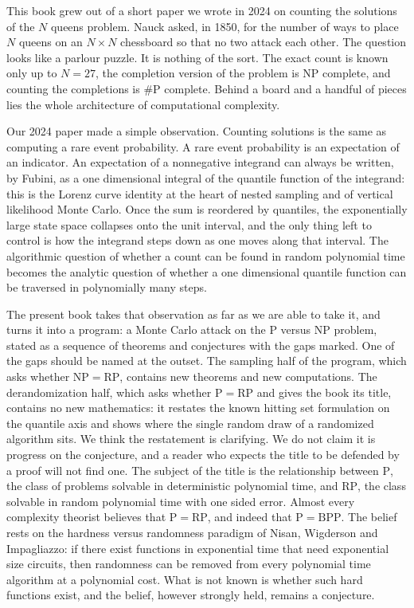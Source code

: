 \documentclass[11pt,twoside,openany]{book}
\theoremstyle{plain}
\theoremstyle{definition}
\theoremstyle{remark}
\newcommand{\RP}{\mathrm{RP}}
\newcommand{\BPP}{\mathrm{BPP}}
\newcommand{\NP}{\mathrm{NP}}
\newcommand{\Pc}{\mathrm{P}}
\newcommand{\sharpP}{\#\mathrm{P}}
\begin{document}
This book grew out of a short paper we wrote in 2024 on counting the solutions of the $N$ queens problem. Nauck asked, in 1850, for the number of ways to place $N$ queens on an $N \times N$ chessboard so that no two attack each other. The question looks like a parlour puzzle. It is nothing of the sort. The exact count is known only up to $N = 27$, the completion version of the problem is NP complete, and counting the completions is $\sharpP$ complete. Behind a board and a handful of pieces lies the whole architecture of computational complexity.

Our 2024 paper made a simple observation. Counting solutions is the same as computing a rare event probability. A rare event probability is an expectation of an indicator. An expectation of a nonnegative integrand can always be written, by Fubini, as a one dimensional integral of the quantile function of the integrand: this is the Lorenz curve identity at the heart of nested sampling and of vertical likelihood Monte Carlo. Once the sum is reordered by quantiles, the exponentially large state space collapses onto the unit interval, and the only thing left to control is how the integrand steps down as one moves along that interval. The algorithmic question of whether a count can be found in random polynomial time becomes the analytic question of whether a one dimensional quantile function can be traversed in polynomially many steps.

The present book takes that observation as far as we are able to take it, and turns it into a program: a Monte Carlo attack on the $\Pc$ versus $\NP$ problem, stated as a sequence of theorems and conjectures with the gaps marked. One of the gaps should be named at the outset. The sampling half of the program, which asks whether $\NP = \RP$, contains new theorems and new computations. The derandomization half, which asks whether $\Pc = \RP$ and gives the book its title, contains no new mathematics: it restates the known hitting set formulation on the quantile axis and shows where the single random draw of a randomized algorithm sits. We think the restatement is clarifying. We do not claim it is progress on the conjecture, and a reader who expects the title to be defended by a proof will not find one. The subject of the title is the relationship between $\Pc$, the class of problems solvable in deterministic polynomial time, and $\RP$, the class solvable in random polynomial time with one sided error. Almost every complexity theorist believes that $\Pc = \RP$, and indeed that $\Pc = \BPP$. The belief rests on the hardness versus randomness paradigm of Nisan, Wigderson and Impagliazzo: if there exist functions in exponential time that need exponential size circuits, then randomness can be removed from every polynomial time algorithm at a polynomial cost. What is not known is whether such hard functions exist, and the belief, however strongly held, remains a conjecture.
\end{document}
